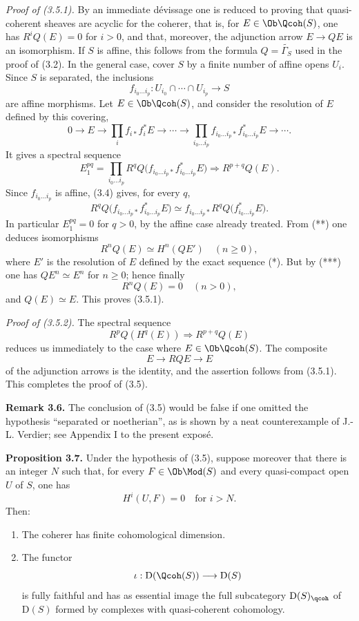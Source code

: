 \emph{Proof of (3.5.1).} By an immediate dévissage one is reduced to proving that quasi-coherent sheaves are acyclic for the coherer, that is, for $E\in\Ob\Qcoh(S)$, one has $R^iQ(E)=0$ for $i>0$, and that, moreover, the adjunction arrow $E\to QE$ is an isomorphism. If $S$ is affine, this follows from the formula $Q=\widetilde{\Gamma_S}$ used in the proof of (3.2). In the general case, cover $S$ by a finite number of affine opens $U_i$. Since $S$ is separated, the inclusions
\[
 f_{i_0\ldots i_p}:U_{i_0}\cap\cdots\cap U_{i_p}\longrightarrow S
\]
are affine morphisms. Let $E\in\Ob\Qcoh(S)$, and consider the resolution of $E$ defined by this covering,
\begin{equation}\tag{*}
 0\longrightarrow E\longrightarrow \prod_i f_{i*}f_i^*E\longrightarrow\cdots\longrightarrow
 \prod_{i_0\ldots i_p}f_{i_0\ldots i_p*}f_{i_0\ldots i_p}^*E\longrightarrow\cdots .
\end{equation}
It gives a spectral sequence
\begin{equation}\tag{**}
 E_1^{pq}=\prod_{i_0\ldots i_p}R^qQ\bigl(f_{i_0\ldots i_p*}f_{i_0\ldots i_p}^*E\bigr)
 \Longrightarrow R^{p+q}Q(E).
\end{equation}
Since $f_{i_0\ldots i_p}$ is affine, (3.4) gives, for every $q$,
\begin{equation}\tag{***}
 R^qQ\bigl(f_{i_0\ldots i_p*}f_{i_0\ldots i_p}^*E\bigr)
 \simeq f_{i_0\ldots i_p*}R^qQ\bigl(f_{i_0\ldots i_p}^*E\bigr).
\end{equation}
In particular $E_1^{pq}=0$ for $q>0$, by the affine case already treated. From (**) one deduces isomorphisms
\[
 R^nQ(E)\simeq H^n(QE')\quad(n\geq0),
\]
where $E'$ is the resolution of $E$ defined by the exact sequence (*). But by (***) one has $QE^n\simeq E^n$ for $n\geq0$; hence finally
\[
 R^nQ(E)=0\quad(n>0),
\]
and $Q(E)\simeq E$. This proves (3.5.1).

\emph{Proof of (3.5.2).} The spectral sequence
\[
 R^pQ(H^q(E))\Longrightarrow R^{p+q}Q(E)
\]
reduces us immediately to the case where $E\in\Ob\Qcoh(S)$. The composite
\[
 E\longrightarrow RQE\longrightarrow E
\]
of the adjunction arrows is the identity, and the assertion follows from (3.5.1). This completes the proof of (3.5).

\textbf{Remark 3.6.} The conclusion of (3.5) would be false if one omitted the hypothesis ``separated or noetherian'', as is shown by a neat counterexample of J.-L. Verdier; see Appendix I to the present exposé.

\textbf{Proposition 3.7.} Under the hypothesis of (3.5), suppose moreover that there is an integer $N$ such that, for every $F\in\Ob\Mod(S)$ and every quasi-compact open $U$ of $S$, one has
\[
 H^i(U,F)=0\quad\text{for }i>N.
\]
Then:
\begin{enumerate}[label=\alph*)]
\item The coherer has finite cohomological dimension.
\item The functor
\[
 \iota:\mathrm D(\Qcoh(S))\longrightarrow \mathrm D(S)
\]
is fully faithful and has as essential image the full subcategory $\mathrm D(S)_{\qcoh}$ of $\mathrm D(S)$ formed by complexes with quasi-coherent cohomology.
\end{enumerate}

